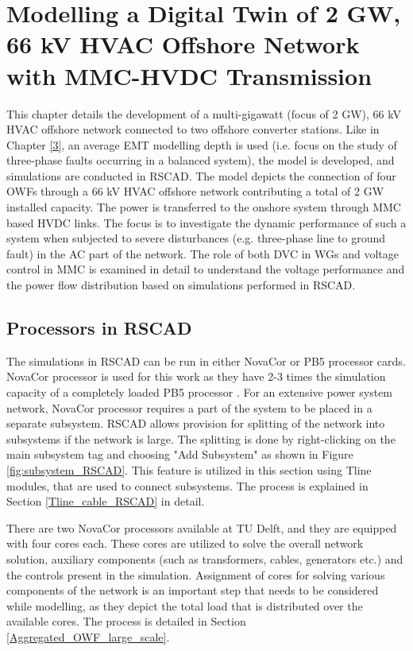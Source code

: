 \chapter{Modelling a Digital Twin of 2 GW, 66 kV HVAC Offshore Network with MMC-HVDC Transmission}\label{4}

This chapter details the development of a multi-gigawatt (focus of 2 GW), 66 kV \gls{HVAC} offshore network connected to two offshore converter stations. Like in Chapter \ref{3}, an average \gls{EMT} modelling depth is used (i.e. focus on the study of three-phase faults occurring in a balanced system), the model is developed, and simulations are conducted in RSCAD. The model depicts the connection of four \gls{OWF}s through a 66 kV \gls{HVAC} offshore network contributing a total of 2 GW installed capacity. The power is transferred to the onshore system through \gls{MMC} based \gls{HVDC} links. The focus is to investigate the dynamic performance of such a system when subjected to severe disturbances (e.g. three-phase line to ground fault) in the \gls{AC} part of the network. The role of both \gls{DVC} in \gls{WG}s and voltage control in \gls{MMC} is examined in detail to understand the voltage performance and the power flow distribution based on simulations performed in RSCAD. %

\section{Processors in RSCAD}\label{split_system}
The simulations in RSCAD can be run in either NovaCor or PB5 processor cards. NovaCor processor is used for this work as they have 2-3 times the simulation capacity of a completely loaded PB5 processor \cite{noauthor_novacor_nodate_1}. For an extensive power system network, NovaCor processor requires a part of the system to be placed in a separate subsystem. RSCAD allows provision for splitting of the network into subsystems if the network is large. The splitting is done by right-clicking on the main subsystem tag and choosing "Add Subsystem" as shown in Figure \ref{fig:subsystem_RSCAD}. This feature is utilized in this section using Tline modules, that are used to connect subsystems. The process is explained in Section \ref{Tline_cable_RSCAD} in detail.

There are two NovaCor processors available at TU Delft, and they are equipped with four cores each. These cores are utilized to solve the overall network solution, auxiliary components (such as transformers, cables, generators etc.) and the controls present in the simulation. Assignment of cores for solving various components of the network is an important step that needs to be considered while modelling, as they depict the total load that is distributed over the available cores. The process is detailed in Section \ref{Aggregated_OWF_large_scale}. 

